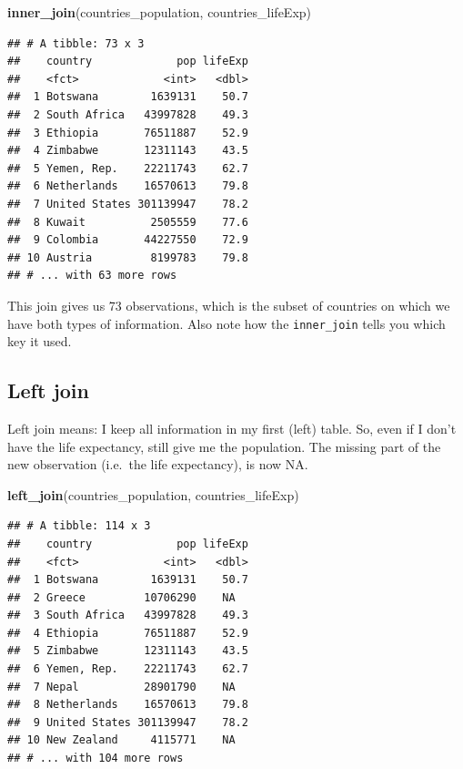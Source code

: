 \documentclass[]{tufte-book}
\newenvironment{Shaded}{}{}
\newcommand{\KeywordTok}[1]{\textcolor[rgb]{0.00,0.44,0.13}{\textbf{#1}}}
\newcommand{\NormalTok}[1]{#1}
\begin{document}
\begin{Shaded}
\begin{Highlighting}[]
\KeywordTok{inner_join}\NormalTok{(countries_population, countries_lifeExp)}
\end{Highlighting}
\end{Shaded}

\begin{verbatim}
## # A tibble: 73 x 3
##    country             pop lifeExp
##    <fct>             <int>   <dbl>
##  1 Botswana        1639131    50.7
##  2 South Africa   43997828    49.3
##  3 Ethiopia       76511887    52.9
##  4 Zimbabwe       12311143    43.5
##  5 Yemen, Rep.    22211743    62.7
##  6 Netherlands    16570613    79.8
##  7 United States 301139947    78.2
##  8 Kuwait          2505559    77.6
##  9 Colombia       44227550    72.9
## 10 Austria         8199783    79.8
## # ... with 63 more rows
\end{verbatim}

This join gives us 73 observations, which is the subset of countries on which we have both types of information. Also note how the \texttt{inner\_join} tells you which key it used.

\hypertarget{left-join}{%
\subsection{Left join}\label{left-join}}

Left join means: I keep all information in my first (left) table. So, even if I don't have the life expectancy, still give me the population. The missing part of the new observation (i.e.~the life expectancy), is now NA.

\begin{Shaded}
\begin{Highlighting}[]
\KeywordTok{left_join}\NormalTok{(countries_population, countries_lifeExp)}
\end{Highlighting}
\end{Shaded}

\begin{verbatim}
## # A tibble: 114 x 3
##    country             pop lifeExp
##    <fct>             <int>   <dbl>
##  1 Botswana        1639131    50.7
##  2 Greece         10706290    NA  
##  3 South Africa   43997828    49.3
##  4 Ethiopia       76511887    52.9
##  5 Zimbabwe       12311143    43.5
##  6 Yemen, Rep.    22211743    62.7
##  7 Nepal          28901790    NA  
##  8 Netherlands    16570613    79.8
##  9 United States 301139947    78.2
## 10 New Zealand     4115771    NA  
## # ... with 104 more rows
\end{verbatim}
\end{document}
